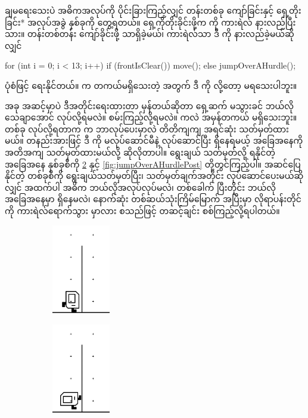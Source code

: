 \begin{sloppypar}
\mmprogram ချမရေးသေးပဲ အဓိကအလုပ်ကို ပိုင်းခြားကြည့်လျှင် တန်းတစ်ခု ကျော်ခြင်းနှင့် ရှေ့တိုးခြင်း* အလုပ်အခွဲ နှစ်ခုကို တွေ့ရတယ်။ ရှေ့ကိုတိုးခိုင်းဖို့က  ကို ကားရဲလ် နားလည်ပြီးသား။ တန်းတစ်တန်း ကျော်ခိုင်းဖို့  \mmcommand သာရှိခဲ့မယ်၊ ကားရဲလ်သာ ဒီ \mmcommand ကို နားလည်ခဲ့မယ်ဆိုလျှင် 
\begin{lstcodeminimal}
for (int i = 0; i < 13; i++) {
        if (frontIsClear()) {
                move();
        } else {
                jumpOverAHurdle();
        }
}
\end{lstcodeminimal} 
ပုံစံဖြင့် ရေးနိုင်တယ်။  က တကယ်မရှိသေးတဲ့ အတွက် ဒီ \mmprogram ကို \mmrun လို့တော့ မရသေးပါဘူး။

အခု အဆင့်မှာပဲ ဒီအတိုင်းရေးထားတာ မှန်တယ်ဆိုတာ ရှေ့ဆက် မသွားခင် ဘယ်လို သေချာအောင် လုပ်လို့ရမလဲ။ စမ်းကြည့်လို့ရမလဲ။  ကလဲ အမှန်တကယ် မရှိသေးဘူး။ တစ်ခု လုပ်လို့ရတာက  \mmcommand က ဘာလုပ်ပေးမှာလဲ တိတိကျကျ အရင်ဆုံး သတ်မှတ်ထားမယ်။ တနည်းအားဖြင့် ဒီ \mmcommand ကို မလုပ်ဆောင်မီနဲ့ လုပ်ဆောင်ပြီး ရှိနေရမယ့် အခြေအနေကို အတိအကျ သတ်မှတ်ထားမယ်လို့ ဆိုလိုတာပါ။ ရွေးချယ် သတ်မှတ်လို့ ရနိုင်တဲ့ အခြေအနေ နှစ်ခုစီကို \Fig \ref*{fig:jumpOverAHurdlePre}   နှင့် \ref*{fig:jumpOverAHurdlePost} တို့တွင်ကြည့်ပါ။ အဆင်ပြေနိုင်တဲ့ တစ်ခုစီကို ရွေးချယ်သတ်မှတ်ပြီး၊ သတ်မှတ်ချက်အတိုင်း  လုပ်ဆောင်ပေးမယ်ဆိုလျှင် အထက်ပါ အဓိက \enForLoop ဘယ်လိုအလုပ်လုပ်မလဲ၊  \mmiteration တစ်ခေါက် ပြီးတိုင်း ဘယ်လို အခြေအနေမှာ ရှိနေမလဲ၊ နောက်ဆုံး တစ်ဆယ်သုံးကြိမ်မြောက် \mmiteration အပြီးမှာ လိုရာပန်းတိုင်ကို ကားရဲလ်ရောက်သွား မှာလား စသည်ဖြင့် တဆင့်ချင်း စစ်ကြည့်လို့ရပါတယ်။

\begin{figure}[tbh!]
  \caption{ }
  \begin{subfigure}[t]{0.3\textwidth}
      \includegraphics[width=1in, left]{ch03/HurdleJumping/JumpOverPre1.jpg}
      \caption{}
      \label{fig:JumpOverPre1}
  \end{subfigure}
  \begin{subfigure}[t]{0.3\textwidth}
      \includegraphics[width=1in, left]{ch03/HurdleJumping/JumpOverPre2.jpg}
      \caption{}
  \end{subfigure}
  \label{fig:jumpOverAHurdlePre}
\end{figure}


\end{sloppypar}
